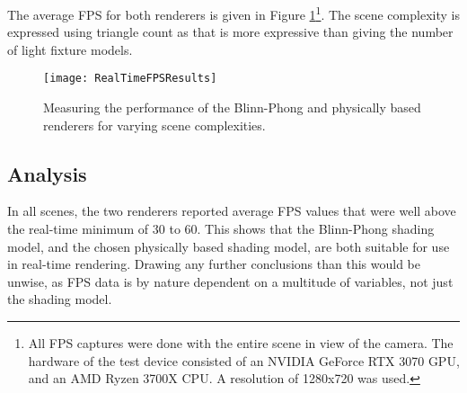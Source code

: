 The average FPS for both renderers is given in Figure \ref{fig:RealTimeFPSResults}\footnote{All FPS captures were done with the entire scene in view of the camera. The hardware of the test device consisted of an NVIDIA GeForce RTX 3070 GPU, and an AMD Ryzen 3700X CPU. A resolution of 1280x720 was used.}. The scene complexity is expressed using triangle count as that is more expressive than giving the number of light fixture models.

\begin{figure}[h]
	\centering
	\texttt{[image: RealTimeFPSResults]}
	\caption{Measuring the performance of the Blinn-Phong and physically based renderers for varying scene complexities.}
	\label{fig:RealTimeFPSResults}
\end{figure}

\subsection{Analysis}

In all scenes, the two renderers reported average FPS values that were well above the real-time minimum of 30 to 60. This shows that the Blinn-Phong shading model, and the chosen physically based shading model, are both suitable for use in real-time rendering. Drawing any further conclusions than this would be unwise, as FPS data is by nature dependent on a multitude of variables, not just the shading model.
